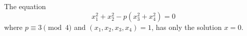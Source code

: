 \begin{proposition}\label{eq:012}
    The equation
\[
    x_1^2+x_2^2-p(x_3^2+x_4^2)=0
\]
    where $p\equiv3\pmod4$ and $(x_1,x_2,x_3,x_4)=1$, has only the solution $x=0$.
\end{proposition}
